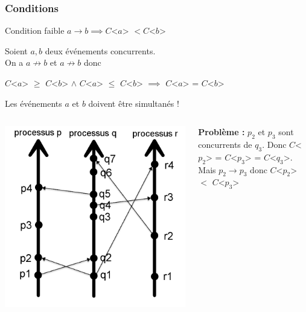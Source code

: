 \documentclass[compress]{beamer}
\begin{document}
\begin{frame}
\frametitle{Conditions}
\begin{block}{Condition faible}
$a \rightarrow b \implies C$<$a$> $ < C$<$b$>
\end{block}
\bigskip
Soient $a, b$ deux événements concurrents. \\On a $a \not\rightarrow b$  et $a \not\rightarrow b$ donc\\
\begin{center}
$C$<$a$>  $\geq$ $C$<$b$> $\land$ $C$<$a$>  $\leq$ $C$<$b$>  $\implies$ $C$<$a$> = $C$<$b$>
\end{center}
Les événements $a$ et $b$ doivent être simultanés !
\end{frame}
\begin{frame}

\begin{columns}
    \begin{column}{.35\textwidth}
		\includegraphics[scale=0.15]{process2.png}
    \end{column}
	\begin{column}{0.65 \textwidth}
\textbf{{\color{red}Problème : }}$p_2$ et $p_3$ sont concurrents de $q_3$. Donc $C$<$p_2$> = $C$<$p_3$> = $C$<$q_3$>. \\
Mais $p_2 \rightarrow p_3$ donc $C$<$p_2$> $<$ $C$<$p_3$>\\ \bigskip

\end{column}
\end{columns}
\end{frame}
\end{document}
